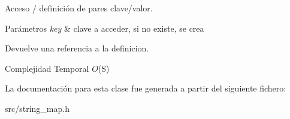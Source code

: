 Acceso / definición de pares clave/valor. 


\begin{DoxyParams}{Parámetros}
{\em key} & clave a acceder, si no existe, se crea \\
\hline
\end{DoxyParams}
\begin{DoxyReturn}{Devuelve}
una referencia a la definicion.
\end{DoxyReturn}

\begin{DoxyDescription}
\item[Complejidad Temporal]$O$(S)
\end{DoxyDescription}

La documentación para esta clase fue generada a partir del siguiente fichero\-:\begin{DoxyCompactItemize}
\item 
src/string\-\_\-map.\-h\end{DoxyCompactItemize}

